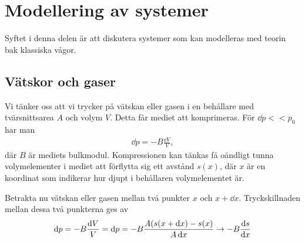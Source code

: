 \section{Modellering av systemer}
Syftet i denna delen är att diskutera systemer som kan modelleras med teorin bak klassiska vågor.

\subsection{Vätskor och gaser}
Vi tänker oss att vi trycker på vätskan eller gasen i en behållare med tvärsnittsarea $A$ och volym $V$. Detta får mediet att komprimeras. För $\dd{p} << p_0$ har man
\begin{align*}
	\dd{p} = -B\frac{\dd{V}}{V},
\end{align*}
där $B$ är mediets bulkmodul. Kompressionen kan tänkas få oändligt tunna volymelementer i mediet att förflytta sig ett avstånd $s(x)$, där $x$ är en koordinat som indikerar hur djupt i behållaren volymelementet är.

Betrakta nu vätskan eller gasen mellan två punkter $x$ och $x + \dd{x}$. Tryckskillnaden mellan dessa två punkterna ges av
\begin{align*}
	\dd{p} = -B\frac{\dd{V}}{V} = \dd{p} = -B\frac{A(s(x + \dd{x}) - s(x)}{A\dd{x}}\to -B\dv{s}{x}
\end{align*}